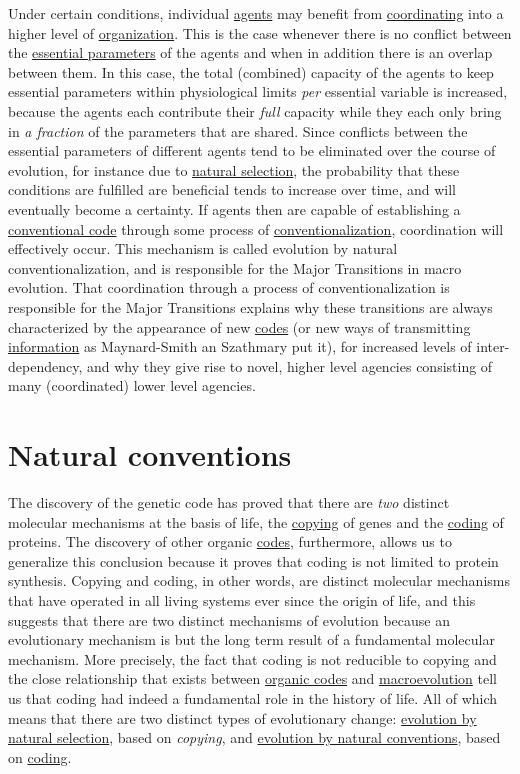 \documentclass[12pt]{article}
\begin{document}
Under certain conditions, individual \hyperlink{agent}{agents} may benefit from
\hyperlink{coordination}{coordinating} into a higher level of
\hyperlink{organization}{organization}.  This is the case whenever
there is no conflict between the
\hyperlink{essential_parameters}{essential parameters} of the agents
and when in addition there is an overlap between them. In this case,
the total (combined) capacity of the agents to keep essential
parameters within physiological limits {\em per} essential variable is
increased, because the agents each contribute their {\em full}
capacity while they each only bring in {\em a fraction} of the
parameters that are shared. Since conflicts between the essential
parameters of different agents tend to be eliminated over the course
of evolution, for instance due to
\hyperlink{natural_selection}{natural selection}, the probability that
these conditions are fulfilled are beneficial tends to increase over
time, and will eventually become a certainty. If agents then are
capable of establishing a \hyperlink{convention}{conventional code}
through some process of
\hyperlink{conventionalization}{conventionalization}, coordination
will effectively occur.  This mechanism is called evolution by natural
conventionalization, and is responsible for the Major Transitions in
macro evolution. That coordination through a process of
conventionalization is responsible for the Major Transitions explains
why these transitions are always characterized by the appearance of
new \hyperlink{code}{codes} (or new ways of transmitting \hyperlink{information}{information} as Maynard-Smith an
Szathmary put it), for increased levels of inter-dependency, and why
they give rise to novel, higher level agencies consisting of many
(coordinated) lower level agencies.

\hypertarget{natural_conventions}{}
\section{Natural conventions}
The discovery of the genetic code has proved that there are \textit{two} distinct molecular mechanisms at the basis of life, the \hyperlink{copying_and_coding}{copying} of genes and the \hyperlink{copying_and_coding}{coding} of proteins. The discovery of other organic \hyperlink{code}{codes}, furthermore, allows us to generalize this conclusion because it proves that coding is not limited to protein synthesis. Copying and coding, in other words, are distinct molecular mechanisms that have operated in all living systems ever since the origin of life, and this suggests that there are two distinct mechanisms of evolution because an evolutionary mechanism is but the long term result of a fundamental molecular mechanism. More precisely, the fact that coding is not reducible to copying and the close relationship that exists between \hyperlink{organic_codes}{organic codes} and \hyperlink{macroevolution}{macroevolution} tell us that coding had indeed a fundamental role in the history of life. All of which means that there are two distinct types of evolutionary change: \hyperlink{natural_selection}{evolution by natural selection}, based on \textit{copying}, and \hyperlink{natural_conventions}{evolution by natural conventions}, based on \hyperlink{copying_and_coding}{coding}.
 
\end{document}
